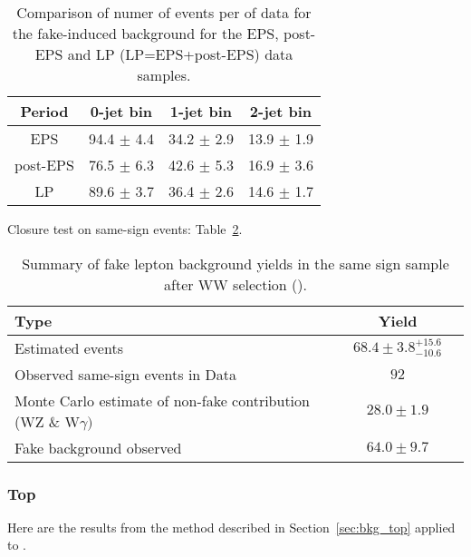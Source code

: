\begin{table}[!htbp]
\begin{center}
\begin{tabular}{c c c c} 
\hline
Period & 0-jet bin & 1-jet bin & 2-jet bin \\ 
\hline
EPS      & 94.4 $\pm$ 4.4 & 34.2 $\pm$ 2.9 & 13.9 $\pm$ 1.9 \\
post-EPS & 76.5 $\pm$ 6.3 & 42.6 $\pm$ 5.3 & 16.9 $\pm$ 3.6 \\
LP       & 89.6 $\pm$ 3.7 & 36.4 $\pm$ 2.6 & 14.6 $\pm$ 1.7 \\
\hline
\end{tabular}
\caption{Comparison of numer of events per \ifb of data for the fake-induced background for the EPS, post-EPS and LP (LP=EPS+post-EPS) data samples.}
\label{tab:lp_periods_fake}
\end{center}
\end{table}

Closure test on same-sign events: Table~\ref{tab:lp_FakeLeptonBkgPrediction_SameSignSample}.
\begin{table}[!htbp]
\begin{center}
\begin{tabular}{|l|c|c|}
\hline
Type                                                             & Yield \\
\hline
Estimated events                                                 &  $68.4\pm3.8^{+15.6}_{-10.6}$  \\
\hline
Observed same-sign events in Data                                &  $92$        \\
Monte Carlo estimate of non-fake contribution (WZ \& W$\gamma)$  & $28.0\pm1.9$ \\
Fake background observed                                         & $64.0\pm9.7$ \\
\hline
\end{tabular}
\caption{Summary of fake lepton background yields in the same sign sample after WW selection (\lpintlumi). }
\label{tab:lp_FakeLeptonBkgPrediction_SameSignSample}
\end{center}
\end{table}

\subsubsection{Top}

Here are the results from the method described in Section~\ref{sec:bkg_top} applied to \lpintlumi.

